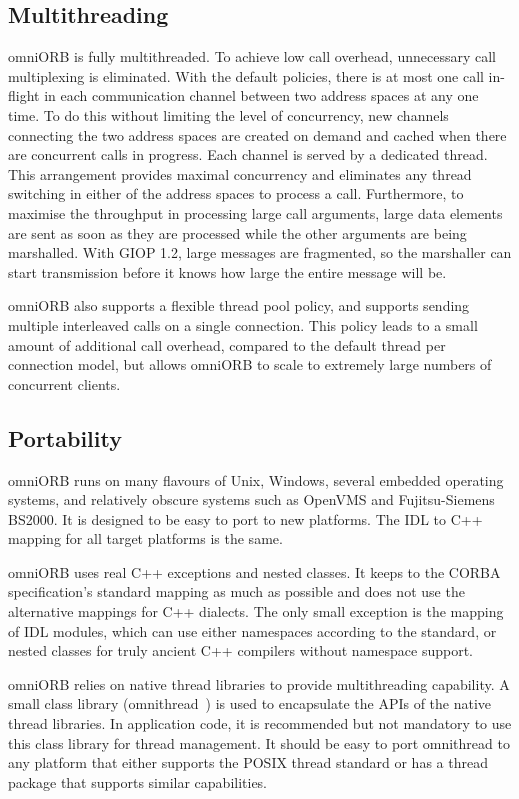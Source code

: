 \documentclass[11pt,twoside,a4paper]{book}
\begin{document}
\subsection{Multithreading}

omniORB is fully multithreaded. To achieve low call overhead,
unnecessary call multiplexing is eliminated. With the default
policies, there is at most one call in-flight in each communication
channel between two address spaces at any one time. To do this without
limiting the level of concurrency, new channels connecting the two
address spaces are created on demand and cached when there are
concurrent calls in progress. Each channel is served by a dedicated
thread. This arrangement provides maximal concurrency and eliminates
any thread switching in either of the address spaces to process a
call. Furthermore, to maximise the throughput in processing large call
arguments, large data elements are sent as soon as they are processed
while the other arguments are being marshalled. With GIOP 1.2, large
messages are fragmented, so the marshaller can start transmission
before it knows how large the entire message will be.

omniORB also supports a flexible thread pool policy, and supports
sending multiple interleaved calls on a single connection. This policy
leads to a small amount of additional call overhead, compared to the
default thread per connection model, but allows omniORB to scale to
extremely large numbers of concurrent clients.


\subsection{Portability}

omniORB runs on many flavours of Unix, Windows, several embedded
operating systems, and relatively obscure systems such as OpenVMS and
Fujitsu-Siemens BS2000.  It is designed to be easy to port to new
platforms. The IDL to C++ mapping for all target platforms is the
same.

omniORB uses real C++ exceptions and nested classes. It keeps to the
CORBA specification's standard mapping as much as possible and does
not use the alternative mappings for C++ dialects. The only small
exception is the mapping of IDL modules, which can use either
namespaces according to the standard, or nested classes for truly
ancient C++ compilers without namespace support.

omniORB relies on native thread libraries to provide multithreading
capability. A small class library (omnithread~\cite{tjr96a}) is used
to encapsulate the APIs of the native thread libraries. In application
code, it is recommended but not mandatory to use this class library
for thread management. It should be easy to port omnithread to any
platform that either supports the POSIX thread standard or has a
thread package that supports similar capabilities.
\end{document}
